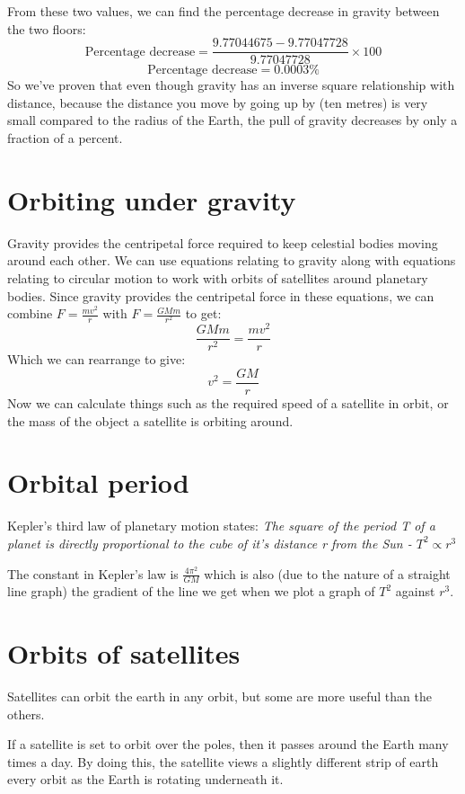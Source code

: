 \documentclass{article}
\begin{document}
From these two values, we can find the percentage decrease in gravity between
the two floors:
\[
	\textrm{Percentage decrease} 
	= \frac{9.77044675 - 9.77047728}{9.77047728} \times 100
\]
\[
	\textrm{Percentage decrease} = 0.0003 \%
\]
So we've proven that even though gravity has an inverse square relationship with
distance, because the distance you move by going up by (ten metres) is very
small compared to the radius of the Earth, the pull of gravity decreases by only
a fraction of a percent.

\section*{Orbiting under gravity}
Gravity provides the centripetal force required to keep celestial bodies moving
around each other. We can use equations relating to gravity along with equations
relating to circular motion to work with orbits of satellites around planetary
bodies. Since gravity provides the centripetal force in these equations, we can
combine $F = \frac{mv^{2}}{r}$ with $F = \frac{GMm}{r^2}$ to get:
\[
	\frac{GMm}{r^2} = \frac{mv^{2}}{r}
\]
Which we can rearrange to give:
\[
	v^{2} = \frac{GM}{r}
\]
Now we can calculate things such as the required speed of a satellite in orbit,
or the mass of the object a satellite is orbiting around.

\section*{Orbital period}
Kepler's third law of planetary motion states: \textit{The square of the period
T of a planet is directly proportional to the cube of it's distance r from the
Sun - $T^2 \propto r^3$}

The constant in Kepler's law is $\frac{4 \pi ^2}{GM}$ which is also (due to the
nature of a straight line graph) the gradient of the line we get when we plot a
graph of $T^2$ against $r^3$.

\section*{Orbits of satellites}
Satellites can orbit the earth in any orbit, but some are more useful than the
others.

If a satellite is set to orbit over the poles, then it passes around the Earth
many times a day. By doing this, the satellite views a slightly different strip
of earth every orbit as the Earth is rotating underneath it.
\end{document}
